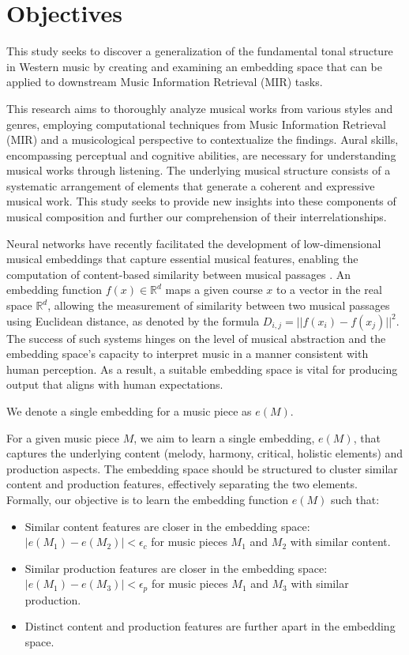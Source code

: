\section{Objectives}

This study seeks to discover a generalization of the fundamental tonal structure in Western music by creating and examining an embedding space that can be applied to downstream Music Information Retrieval (MIR) tasks.

This research aims to thoroughly analyze musical works from various styles and genres, employing computational techniques from Music Information Retrieval (MIR) and a musicological perspective to contextualize the findings. Aural skills, encompassing perceptual and cognitive abilities, are necessary for understanding musical works through listening. The underlying musical structure consists of a systematic arrangement of elements that generate a coherent and expressive musical work. This study seeks to provide new insights into these components of musical composition and further our comprehension of their interrelationships.

Neural networks have recently facilitated the development of low-dimensional musical embeddings that capture essential musical features, enabling the computation of content-based similarity between musical passages \cite{Kim2021LearningLoss}\cite{Hung2022Feature-informedClassification}. An embedding function $f(x) \in \mathbb{R}^d$ maps a given course $x$ to a vector in the real space $\mathbb{R}^d$, allowing the measurement of similarity between two musical passages using Euclidean distance, as denoted by the formula $D_{i,j} = ||f(x_i) - f(x_j)||^2$. The success of such systems hinges on the level of musical abstraction and the embedding space's capacity to interpret music in a manner consistent with human perception. As a result, a suitable embedding space is vital for producing output that aligns with human expectations.

We denote a single embedding for a music piece as $e(M)$.

For a given music piece $M$, we aim to learn a single embedding, $e(M)$, that captures the underlying content (melody, harmony, critical, holistic elements) and production aspects. The embedding space should be structured to cluster similar content and production features, effectively separating the two elements. Formally, our objective is to learn the embedding function $e(M)$ such that:

\begin{itemize}
\item Similar content features are closer in the embedding space: $|e(M_1) - e(M_2)| < \epsilon_c$ for music pieces $M_1$ and $M_2$ with similar content.
\item Similar production features are closer in the embedding space: $|e(M_1) - e(M_3)| < \epsilon_p$ for music pieces $M_1$ and $M_3$ with similar production.
\item Distinct content and production features are further apart in the embedding space.
\end{itemize}


